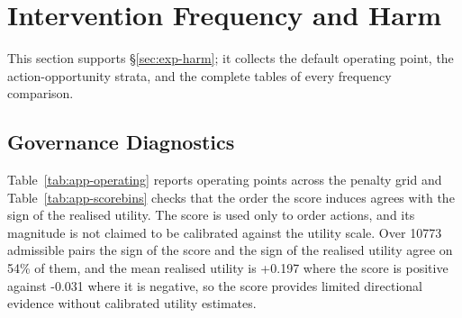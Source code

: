 \documentclass{article}
\begin{document}
\section{Intervention Frequency and Harm}

This section supports \S\ref{sec:exp-harm}; it collects the default operating point, the
action-opportunity strata, and the complete tables of every frequency comparison.

\subsection{Governance Diagnostics}
\label{app:governance-fig}
Table~\ref{tab:app-operating} reports operating points across the penalty grid and
Table~\ref{tab:app-scorebins} checks that the order the score induces agrees with the sign of
the realised utility. The score is used only to order actions, and its magnitude is not claimed
to be calibrated against the utility scale. Over 10773 admissible pairs the sign of the score and the sign of the realised utility agree on 54\% of them, and the mean realised utility is +0.197 where the score is positive against -0.031 where it is negative, so the score provides limited directional evidence without calibrated utility estimates.

\begin{table}[htbp]
  \caption{Operating points over the penalty grid, with the neighbourhood size frozen at the
  selected value on each backbone. Intervention rate is the share of requests on which a
  non-reference action ran, and conditional HIR is the share of those that raised the loss.
  Raising the penalty moves the rate and leaves the conditional rate close to where it was, so
  the largest change is in intervention frequency.}
  \label{tab:app-operating}
  \centering
  \small
  \setlength{\tabcolsep}{4pt}
\end{table}
\end{document}

